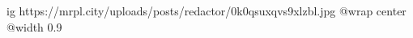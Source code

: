  
 
 
 
 

\ifcmt
  ig https://mrpl.city/uploads/posts/redactor/0k0qsuxqvs9xlzbl.jpg
  @wrap center
  @width 0.9
\fi
